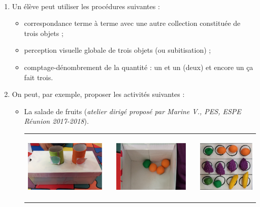 \begin{corrige}
\ \\ [-5mm]
\begin{enumerate}
   \item Un élève peut utiliser les procédures suivantes :
   \begin{itemize}
      \item correspondance terme à terme avec une autre collection constituée de trois objets ;
      \item perception visuelle globale de trois objets (ou subitisation) ;
      \item comptage-dénombrement de la quantité : un et un (deux) et encore un ça fait trois.
   \end{itemize}
   \bigskip
   \item On peut, par exemple, proposer les activités suivantes :
   \begin{itemize}
      \item La salade de fruits ({\it atelier dirigé proposé par Marine V., PES, ESPE Réunion 2017-2018}). \\ [1mm]
      \begin{tabular}{C{5}cC{4.5}cC{4.05}}
         \includegraphics[height=3.3cm]{Nombres_et_calculs_did/Images/Num1_analyse_quatre_boite}
         &&
         \includegraphics[height=3.3cm]{Nombres_et_calculs_did/Images/Num1_analyse_quatre_contenu}
         &&
         \includegraphics[height=3.3cm]{Nombres_et_calculs_did/Images/Num1_analyse_quatre_maison} \\

\end{tabular}
\end{itemize}
\end{enumerate}
\end{corrige}
